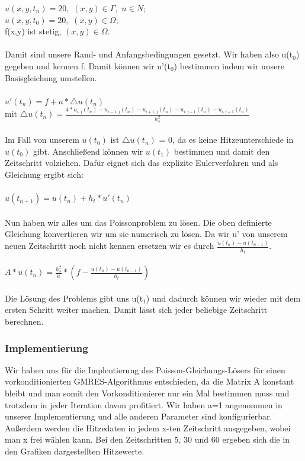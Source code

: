 \documentclass{report}
\begin{document}
$u(x,y,t_{n}) = 20,$   $(x,y) \in \Gamma ,$   $ n \in N;$\\
$u(x,y,t_{0}) = 20,$   $ (x,y) \in \Omega ; $ \\
f(x,y) ist stetig,   $ (x,y) \in \Omega .$ \\
\\
Damit sind unsere Rand- und Anfangsbedingungen gesetzt. Wir haben also u(t$_{0}$) gegeben und kennen f. Damit können wir u'(t$_{0}$) bestimmen indem wir unsere Basisgleichung umstellen.\\
\\
$u'(t_{n})  = f + a * \triangle u(t_{n})$\\
mit $\triangle u(t_{n}) = \frac{4*u_{i,j}(t_{n})-u_{i-1,j}(t_{n})-u_{i+1,j}(t_{n})-u_{i,j-1}(t_{n})-u_{i,j+1}(t_{n})}{h_{s}^{2}}$\\
\\
Im Fall von unserem $u(t_{0})$ ist $\triangle u(t_{n})$ = 0, da es keine Hitzeunterschiede in $u(t_{0})$ gibt. Anschließend können wir $u(t_{1})$ bestimmen und damit den Zeitschritt volziehen. Dafür eignet sich das explizite Eulerverfahren und als Gleichung ergibt sich:\\
\\
$u(t_{n+1})  =u(t_{n}) + h_{t} * u'(t_{n})$\\
\\
Nun haben wir alles um das Poissonproblem zu lösen. Die oben definierte Gleichung konvertieren wir um sie numerisch zu lösen. Da wir u' von unserem neuen Zeitschritt noch nicht kennen ersetzen wir es durch $\frac{ u(t_{n}) -  u(t_{n-1})}{h_{t}}$.\\
\\
$A* u(t_{n}) = \frac{h_{s}^{2}}{a} * ( f-\frac{ u(t_{n}) -  u(t_{n-1})}{h_{t}}) $\\
\\
Die Lösung des Problems gibt uns u(t$_{1}$) und dadurch können wir wieder mit dem ersten Schritt weiter machen. Damit lässt sich jeder beliebige Zeitschritt berechnen.
\subsubsection{Implementierung}
Wir haben uns für die Implentierung des Poisson-Gleichungs-Lösers für einen vorkonditionierten GMRES-Algorithmus entschieden, da die Matrix A konstant bleibt und man somit den Vorkonditionierer nur ein Mal bestimmen muss und trotzdem in jeder Iteration davon profitiert. Wir haben a=1 angenommen in unserer Implementierung und alle anderen Parameter sind konfigurierbar. Außerdem werden die Hitzedaten in jedem x-ten Zeitschritt ausgegeben, wobei man x frei wählen kann. Bei den Zeitschritten 5, 30 und 60 ergeben sich die in den Grafiken dargestellten Hitzewerte. \\
\end{document}
